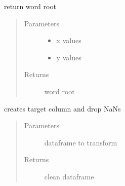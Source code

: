 \documentclass[letterpaper,10pt,english]{sphinxmanual}
\begin{document}

\begin{fulllineitems}
\label{\detokenize{algorithms:algorithms.ird.ird_trainer.__do_stemmer}}
\sphinxAtStartPar
return word root
\begin{quote}\begin{description}
\item[{Parameters}] \leavevmode\begin{itemize}
\item {} 
\sphinxAtStartPar
{} \textendash{} x values

\item {} 
\sphinxAtStartPar
{} \textendash{} y values

\end{itemize}

\item[{Returns}] \leavevmode
\sphinxAtStartPar
word root

\end{description}\end{quote}

\end{fulllineitems}


\begin{fulllineitems}
\label{\detokenize{algorithms:algorithms.ird.ird_trainer.__transform_df}}
\sphinxAtStartPar
creates target column and drop NaNs
\begin{quote}\begin{description}
\item[{Parameters}] \leavevmode
\sphinxAtStartPar
{} \textendash{} dataframe to transform

\item[{Returns}] \leavevmode
\sphinxAtStartPar
clean dataframe

\end{description}\end{quote}

\end{fulllineitems}
\end{document}
